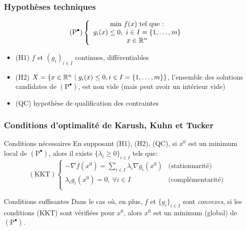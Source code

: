 \documentclass{beamer}
\newcommand{\R}{{\ensuremath\mathbb{R}}}
\begin{document}
\begin{frame}
  \frametitle{Hypothèses techniques}

  \[
  (\text{P}^\bullet) \left\{
  \begin{array}{c}
    \text{min} \ f(x) \ \text{tel que :} \\
    g_i(x) \leq 0, \ i \in I = \{1, \dots, m\} \\
    x \in \R^n
  \end{array}
  \right.
  \]

  \begin{itemize}
  \item (H1) $f$ et $(g_i)_{i \in I}$ continues, différentiables
  \item (H2) $X = \{ x \in \R^n \ | \ g_i(x) \leq 0, i \in I = \{1, \dots, m\} \}$,
    l'ensemble des solutions candidates de $(\text{P}^\bullet)$, est non vide
    (mais peut avoir un intérieur vide)
  \item (QC) hypothèse de qualification des contraintes
  \end{itemize}
  
\end{frame}

\begin{frame}
  \frametitle{Conditions d'optimalité de Karush, Kuhn et Tucker}

  \begin{block}{Conditions nécessaires}
    En supposant (H1), (H2), (QC), si $x^0$ est un minimum local de $(\text{P}^\bullet)$,
    alors il existe $\{\lambda_i \geq 0\}_{i \in I}$ tels que:
    \[
    (\text{KKT})
    \left\{
    \begin{array}{ll}
      -{\nabla f}(x^0) = \sum_{i \in I} \lambda_i {\nabla g_i}(x^0)
      & \text{(stationnarité)} \\
      \lambda_i g_i(x^0) = 0, \ \forall i \in I
      & \text{(complémentarité)} \\
    \end{array}
    \right.
    \]
  \end{block}

  \begin{block}{Conditions suffisantes}
    Dans le cas où, en plus, $f$ et $\{g_i\}_{i\in I}$ sont \emph{convexes},
    si les conditions (KKT) sont vérifiées pour $x^0$, alors $x^0$ est un minimum
    (global) de $(\text{P}^\bullet)$.  
  \end{block}
  
\end{frame}
\end{document}
